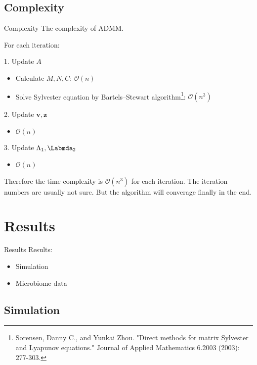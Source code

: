\documentclass{beamer}
\begin{document}
\subsection{Complexity}

\begin{frame}{Complexity}
 The complexity of ADMM.
 
 \vfill
 
 For each iteration:
 
 1. Update $A$
 \begin{itemize}
     \item Calculate $M,N,C$:  $\mathcal{O}(n)$
     \item Solve Sylvester equation by Bartels–Stewart algorithm\footnote{Sorensen, Danny C., and Yunkai Zhou. "Direct methods for matrix Sylvester and Lyapunov equations." Journal of Applied Mathematics 6.2003 (2003): 277-303.}: $\mathcal{O}(n^{3})$
 \end{itemize}
 
 2. Update $\mathbf{v,z}$
 \begin{itemize}
     \item  $\mathcal{O}(n)$
 \end{itemize}
 
 3. Update $\Lambda_1, \Labmda_2$
  \begin{itemize}
     \item  $\mathcal{O}(n)$
 \end{itemize}
 
Therefore the time complexity is $\mathcal{O}(n^{3})$ for each iteration.
\vfill
The iteration numbers are usually not sure. But the algorithm will converage finally in the end. 

\end{frame}




\section{Results}

\begin{frame}{Results}
    Results:
    \begin{itemize}
        \item Simulation
        \item Microbiome data
    \end{itemize}
\end{frame}


\subsection{Simulation}
\end{document}
